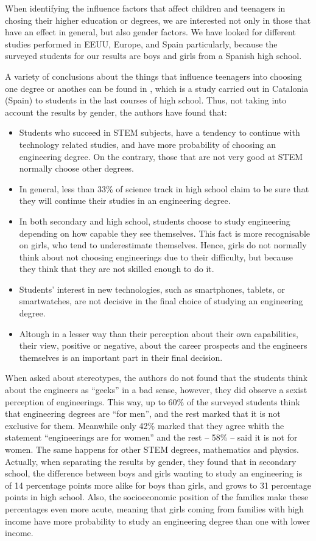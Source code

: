 \documentclass[journal,transmag]{IEEEtran}
\begin{document}
When identifying the influence factors that affect children and teenagers in chosing their higher education or degrees, we are interested not only in those that have an effect in general, but also gender factors. We have looked for different studies performed in EEUU, Europe, and Spain particularly, because the surveyed students for our results are boys and girls from a Spanish high school.

A variety of conclusions about the things that influence teenagers into choosing one degree or anothes can be found in \cite{everis2012}, which is a study carried out in Catalonia (Spain) to students in the last courses of high school. Thus, not taking into account the results by gender, the authors have found that:

\begin{itemize}
	\item Students who succeed in STEM subjects, have a tendency to continue with technology related studies, and have more probability of choosing an engineering degree. On the contrary, those that are not very good at STEM normally choose other degrees.
	\item In general, less than 33\% of science track in high school claim to be sure that they will continue their studies in an engineering degree.
	\item In both secondary and high school, students choose to study engineering depending on how capable they see themselves. This fact is more recognisable on girls, who tend to underestimate themselves. Hence, girls do not normally think about not choosing engineerings due to their difficulty, but because they think that they are not skilled enough to do it.
	\item Students' interest in new technologies, such as smartphones, tablets, or smartwatches, are not decisive in the final choice of studying an engineering degree.
	\item Altough in a lesser way than their perception about their own capabilities, their view, positive or negative, about the career prospects and the engineers themselves is an important part in their final decision.
\end{itemize}

When asked about stereotypes, the authors do not found that the students think about the engineers as ``geeks'' in a bad sense, however, they did observe a sexist perception of engineerings. This way, up to 60\% of the surveyed students think that engineering degrees are ``for men'', and the rest marked that it is not exclusive for them. Meanwhile only 42\% marked that they agree whith the statement ``engineerings are for women'' and the rest -- 58\% -- said it is not for women. The same happens for other STEM degrees, mathematics and physics. Actually, when separating the results by gender, they found that in secondary school, the difference between boys and girls wanting to study an engineering is of 14 percentage points more alike for boys than girls, and grows to 31 percentage points in high school. Also, the socioeconomic position of the families make these percentages even more acute, meaning that girls coming from families with high income have more probability to study an engineering degree than one with lower income.
\end{document}
